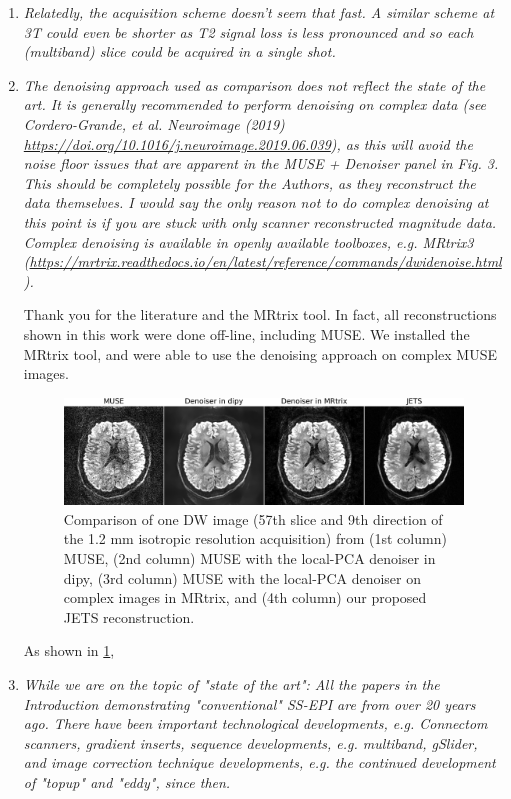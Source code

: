 \documentclass[a4paper,11pt,twoside]{report}
\begin{document}
\begin{enumerate}
    \item \textit{Relatedly, the acquisition scheme doesn't seem that fast. A similar scheme at 3T could even be shorter as T2 signal loss is less pronounced and so each (multiband) slice could be acquired in a single shot.}
    \item \textit{The denoising approach used as comparison does not reflect the state of the art. It is generally recommended to perform denoising on complex data (see Cordero-Grande, et al. Neuroimage (2019) \url{https://doi.org/10.1016/j.neuroimage.2019.06.039}), as this will avoid the noise floor issues that are apparent in the MUSE + Denoiser panel in Fig. 3. This should be completely possible for the Authors, as they reconstruct the data themselves. I would say the only reason not to do complex denoising at this point is if you are stuck with only scanner reconstructed magnitude data. Complex denoising is available in openly available toolboxes, e.g. MRtrix3 (\url{https://mrtrix.readthedocs.io/en/latest/reference/commands/dwidenoise.html}).}

    \hspace{1em} Thank you for the literature and the MRtrix tool.
    In fact, all reconstructions shown in this work were done off-line,
    including MUSE.
    We installed the MRtrix tool, and were able to use
    the denoising approach on complex MUSE images.

    \begin{figure}[ht]
        \centering
        \includegraphics[width=\textwidth]{comp_dwi_denoiser.png}
        \caption{Comparison of one DW image
        (57th slice and 9th direction of
        the 1.2 mm isotropic resolution acquisition) from
        (1st column) MUSE,
        (2nd column) MUSE with the local-PCA denoiser in dipy,
        (3rd column) MUSE with the local-PCA denoiser on complex images in MRtrix, and
        (4th column) our proposed JETS reconstruction.}
        \label{FIG:Denoiser}
    \end{figure}

    As shown in \cref{FIG:Denoiser},

    \item \textit{While we are on the topic of "state of the art": All the papers in the Introduction demonstrating "conventional" SS-EPI are from over 20 years ago. There have been important technological developments, e.g. Connectom scanners, gradient inserts, sequence developments, e.g. multiband, gSlider, and image correction technique developments, e.g. the continued development of "topup" and "eddy", since then.}


\end{enumerate}
\end{document}
